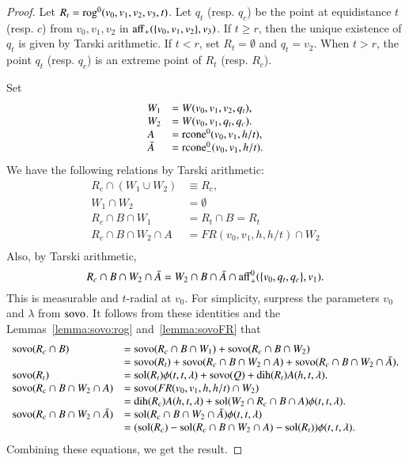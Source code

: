 \begin{proof}  Let $R_t= {\operatorname{rog}}^0(v_0,v_1,v_2,v_3,t)$.   Let
$q_t$ (resp. $q_c$) be the point at equidistance $t$ 
(resp. $c$) from $v_0,v_1,v_2$ in
${\operatorname{aff}}_+(\{v_0,v_1,v_2\},v_3)$.
If $t\ge r$, then the unique existence of $q_t$ is given by
Tarski arithmetic.  If $t< r$, set $R_t=\emptyset$ and
$q_t=v_2$.
When $t>r$, the point $q_t$ (resp. $q_c$) is an extreme point of $R_t$ (resp. $R_c$).

Set
  $$
  \begin{array}{lll}
  W_1 &= W(v_0,v_1,v_2,q_t),\\  
  W_2 &= W(v_0,v_1,q_t,q_c).\\
  A &= {\operatorname{rcone}}^0(v_0,v_1,h/t),\\
  \bar A &= {\operatorname{rcone}}^0_-(v_0,v_1,h/t).\\
  \end{array}
  $$
We have the following relations by Tarski arithmetic:
  $$
  \begin{array}{rll}
  R_c \cap (W_1\cup W_2) &\equiv R_c,\\
  W_1\cap W_2 &= \emptyset\\
  R_c \cap B \cap W_1 &= R_t \cap B = R_t\\
  R_c\cap B \cap W_2 \cap A &= FR(v_0,v_1,h,h/t)\cap W_2\\
  \end{array}
  $$
Also, by Tarski arithmetic,
  $$R_c\cap B\cap W_2\cap \bar A = W_2\cap B\cap \bar A \cap
   {\operatorname{aff}}_+^0(\{v_0,q_t,q_c\},v_1).$$ 
This is measurable and $t$-radial
at $v_0$.
For simplicity, surpress the parameters $v_0$ and $\lambda$ from
${\operatorname{sovo}}$.  It follows from these identities and the
Lemmas~\ref{lemma:sovo:rog} 
and~\ref{lemma:sovoFR} that
  $$
  \begin{array}{lll}
  {\operatorname{sovo}}(R_c\cap B) &= {\operatorname{sovo}}(R_c\cap B\cap W_1) + 
  {\operatorname{sovo}}(R_c\cap B\cap W_2)\\
  &= {\operatorname{sovo}}(R_t)+ {\operatorname{sovo}}(R_c\cap B\cap W_2\cap A) +
  {\operatorname{sovo}}(R_c\cap B\cap W_2\cap \bar A).\\
  {\operatorname{sovo}}(R_t) &=\operatorname{sol}(R_t)\phi(t,t,\lambda) + {\operatorname{sovo}}(Q) +
     \operatorname{dih}(R_t) A(h,t,\lambda).\\
  {\operatorname{sovo}}(R_c\cap B\cap W_2\cap A) &= {\operatorname{sovo}}(FR(v_0,v_1,h,h/t)\cap W_2)\\
   &= \operatorname{dih}(R_c) A(h,t,\lambda) + \operatorname{sol}(W_2\cap R_c\cap B\cap A)\phi(t,t,\lambda).\\
   {\operatorname{sovo}}(R_c\cap B\cap W_2\cap \bar A) &= 
        \operatorname{sol}(R_c\cap B\cap W_2\cap \bar A) \phi(t,t,\lambda)\\
   &= (\operatorname{sol}(R_c)-\operatorname{sol}(R_c\cap B\cap W_2\cap A) -\operatorname{sol}(R_t))\phi(t,t,\lambda).
  \end{array}
  $$
Combining these equations, we get the result.
\end{proof}

